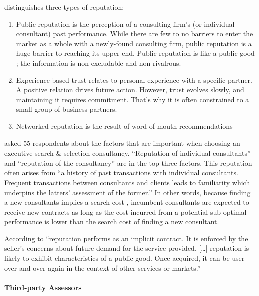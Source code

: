 \documentclass[12pt]{article}
\providecommand{\tightlist}{%
  \setlength{\itemsep}{0pt}\setlength{\parskip}{0pt}}
\begin{document}
\citet[75-76]{armbruster2006} distinguishes three types of reputation:

\begin{enumerate}
\def\labelenumi{\arabic{enumi}.}
\tightlist
\item
  Public reputation is the perception of a consulting firm's (or
  individual consultant) past performance. While there are few to no
  barriers to enter the market as a whole with a newly-found consulting
  firm, public reputation is a huge barrier to reaching its upper end.
  Public reputation is like a public good ; the information is
  non-excludable and non-rivalrous.
\item
  Experience-based trust relates to personal experience with a specific
  partner. A positive relation drives future action. However, trust
  evolves slowly, and maintaining it requires commitment. That's why it
  is often constrained to a small group of business partners.
\item
  Networked reputation is the result of word-of-mouth recommendations
\end{enumerate}

\citet[243-244]{clark1993} asked 55 respondents about the factors that
are important when choosing an executive search \& selection
consultancy. ``Reputation of individual consultants'' and ``reputation
of the consultancy'' are in the top three factors. This reputation often
arises from ``a history of past transactions with individual
consultants. Frequent transactions between consultants and clients leads
to familiarity which underpins the latters' assessment of the former.''
In other words, because finding a new consultants implies a search cost
\citep[ 1072]{wilson2012}, incumbent consultants are expected to receive
new contracts as long as the cost incurred from a potential sub-optimal
performance is lower than the search cost of finding a new consultant.

According to \citet[516]{nayyar1990} ``reputation performs as an
implicit contract. It is enforced by the seller's concerns about future
demand for the service provided. {[}\ldots{]} reputation is likely to
exhibit characteristics of a public good. Once acquired, it can be user
over and over again in the context of other services or markets.''

\hypertarget{third-party-assessors}{%
\paragraph{Third-party Assessors}\label{third-party-assessors}}
\end{document}
